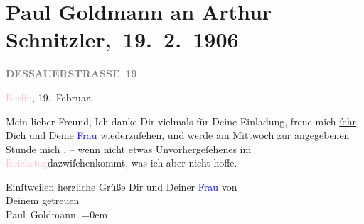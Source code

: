 

\renewcommand{\erwaehntePersonen}{Personen: Olga Schnitzler}
\renewcommand{\erwaehnteOrte}{Orte: Berlin, Dessauer Straße, Reichstag}
\renewcommand{\erwaehnteWerke}{}
\section[ Paul Goldmann an Arthur Schnitzler, 19. 2. 1906]{Paul Goldmann an Arthur Schnitzler, 19. 2. 1906}
\nopagebreak{}
\rehead{ }\normalsize\beginnumbering{}
\toendnotes[C]{\smallbreak\pagebreak[2]}
\toendnotes[C]{\smallbreak}
\pstart
           \noindent{}\raggedleft{}{\pb}\textcolor{pink}{\textcolor{gray}{\textbf{DESSAUERSTRASSE 19}}}{}\ledrightnote{\textcolor{pink}{Dessauer Straße}}\pend
           
\pstart
           \textcolor{pink}{Berlin}{}\ledrightnote{\textcolor{pink}{Berlin}}, 19. Februar.\pend
           
\pstart{}Mein lieber Freund,\pend
\pstart
           Ich danke Dir vielmals für Deine Einladung, freue mich \uline{ſehr}, Dich und Deine \textcolor{blue}{Frau}{}\ledrightnote{{$\rightarrow$}\textcolor{blue}{Olga Schnitzler}} wiederzuſehen, und werde am Mittwoch zur
               angegebenen Stunde mich \label{K-L03240-1v}\label{K-L03240-1h}, – wenn nicht etwas
               Unvorhergeſehenes im \textcolor{pink}{Reichstag}{}\ledrightnote{\textcolor{pink}{Reichstag}}{ }{\pb}dazwiſchenkommt, was
               ich aber nicht hoffe.\pend
           
\pstart
           Einſtweilen herzliche Grüße Dir und Deiner \textcolor{blue}{Frau}{}\ledrightnote{{$\rightarrow$}\textcolor{blue}{Olga Schnitzler}} von {\\[\baselineskip]}Deinem getreuen {\\[\baselineskip]}\spacefill\mbox{Paul
                  Goldmann.}\pend
           \leftskip=0em{}\endnumbering{}  
      